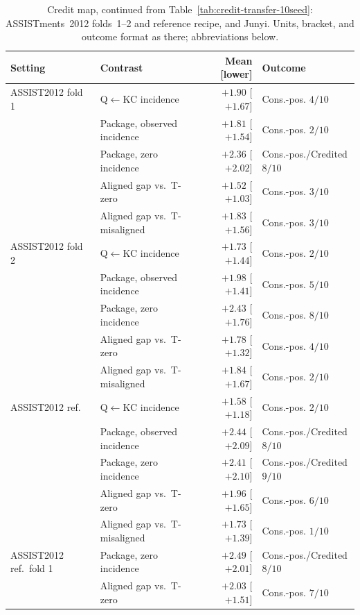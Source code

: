 \begin{table}[tbp]
\caption{Credit map, continued from Table~\ref{tab:credit-transfer-10seed}:
ASSISTments~2012 folds~1--2 and reference recipe, and Junyi. Units, bracket, and outcome format as there;
abbreviations below.}
\label{tab:credit-transfer-10seed-b}
\centering
\scriptsize
\setlength{\tabcolsep}{3pt}
\renewcommand{\arraystretch}{0.84}
\begin{tabular}{@{}llrl@{}}
\toprule
Setting & Contrast & Mean [lower] & Outcome \\
\midrule
ASSIST2012 fold 1 & Q$\leftarrow$KC incidence & $+1.90$ [$+1.67$] & Cons.-pos. $4/10$ \\
 & Package, observed incidence & $+1.81$ [$+1.54$] & Cons.-pos. $2/10$ \\
 & Package, zero incidence & $+2.36$ [$+2.02$] & Cons.-pos./Credited $8/10$ \\
 & Aligned gap vs.\ T-zero & $+1.52$ [$+1.03$] & Cons.-pos. $3/10$ \\
 & Aligned gap vs.\ T-misaligned & $+1.83$ [$+1.56$] & Cons.-pos. $3/10$ \\
\addlinespace[1pt]
ASSIST2012 fold 2 & Q$\leftarrow$KC incidence & $+1.73$ [$+1.44$] & Cons.-pos. $2/10$ \\
 & Package, observed incidence & $+1.98$ [$+1.41$] & Cons.-pos. $5/10$ \\
 & Package, zero incidence & $+2.43$ [$+1.76$] & Cons.-pos. $8/10$ \\
 & Aligned gap vs.\ T-zero & $+1.78$ [$+1.32$] & Cons.-pos. $4/10$ \\
 & Aligned gap vs.\ T-misaligned & $+1.84$ [$+1.67$] & Cons.-pos. $2/10$ \\
\addlinespace[1pt]
ASSIST2012 ref. & Q$\leftarrow$KC incidence & $+1.58$ [$+1.18$] & Cons.-pos. $2/10$ \\
 & Package, observed incidence & $+2.44$ [$+2.09$] & Cons.-pos./Credited $8/10$ \\
 & Package, zero incidence & $+2.41$ [$+2.10$] & Cons.-pos./Credited $9/10$ \\
 & Aligned gap vs.\ T-zero & $+1.96$ [$+1.65$] & Cons.-pos. $6/10$ \\
 & Aligned gap vs.\ T-misaligned & $+1.73$ [$+1.39$] & Cons.-pos. $1/10$ \\
\addlinespace[1pt]
ASSIST2012 ref.\ fold 1 & Package, zero incidence & $+2.49$ [$+2.01$] & Cons.-pos./Credited $8/10$ \\
 & Aligned gap vs.\ T-zero & $+2.03$ [$+1.51$] & Cons.-pos. $7/10$ \\

\end{tabular}
\end{table}
